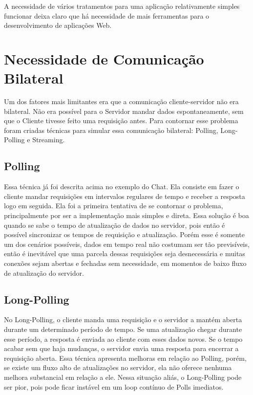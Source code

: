\documentclass[a4paper,12pt]{article}
\begin{document}
A necessidade de vários tratamentos para uma aplicação relativamente simples funcionar deixa claro que há necessidade de mais ferramentas para o desenvolvimento de aplicações Web.


\section{Necessidade de Comunicação Bilateral}



Um dos fatores mais limitantes era que a comunicação cliente-servidor não era bilateral. Não era possível para o Servidor mandar dados espontaneamente, sem que o Cliente tivesse feito uma requisição antes. Para contornar esse problema foram criadas técnicas para simular essa comunicação bilateral: Polling, Long-Polling e Streaming.

\subsection{Polling}

Essa técnica já foi descrita acima no exemplo do Chat. Ela consiste em fazer o cliente mandar requisições em intervalos regulares de tempo e receber a resposta logo em seguida. Ela foi a primeira tentativa de se contornar o problema, principalmente por ser a implementação mais simples e direta. Essa solução é boa quando se sabe o tempo de atualização de dados no servidor, pois então é possível sincronizar os tempos de requisição e atualização. Porém esse é somente um dos cenários possíveis, dados em tempo real não costumam ser tão previsíveis, então é inevitável que uma parcela dessas requisições seja desnecessária e muitas conexões sejam abertas e fechadas sem necessidade, em momentos de baixo fluxo de atualização do servidor.


\subsection{Long-Polling}

No Long-Polling, o cliente manda uma requisição e o servidor a mantém aberta durante um determinado período de tempo. Se uma atualização chegar durante esse período, a resposta é enviada ao cliente com esses dados novos. Se o tempo acabar sem que haja mudanças, o servidor envia uma resposta para encerrar a requisição aberta. Essa técnica apresenta melhoras em relação ao Polling, porém, se existe um fluxo alto de atualizações no servidor, ela não oferece nenhuma melhora substancial em relação a ele. Nessa situação aliás, o Long-Polling pode ser pior, pois pode ficar instável em um loop contínuo de Polls imediatos.
\end{document}
